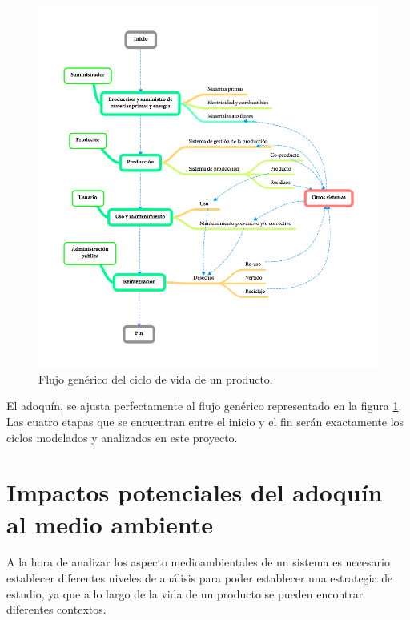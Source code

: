 \begin{figure}[!htb]
\centering
\includegraphics[width=15cm]{flujo_generico_acv.png}
\caption{Flujo genérico del ciclo de vida de un producto.}
\label{fig:flujo_generico_acv}
\end{figure}

El adoquín, se ajusta perfectamente al flujo genérico representado en la figura \ref{fig:flujo_generico_acv}. Las cuatro etapas que se encuentran entre el inicio y el fin serán exactamente los ciclos modelados y analizados en este proyecto.

\section{Impactos potenciales del adoquín al medio ambiente}
A la hora de analizar los aspecto medioambientales de un sistema es necesario establecer diferentes niveles de análisis para poder establecer una estrategia de estudio, ya que a lo largo de la vida de un producto se pueden encontrar diferentes contextos.

